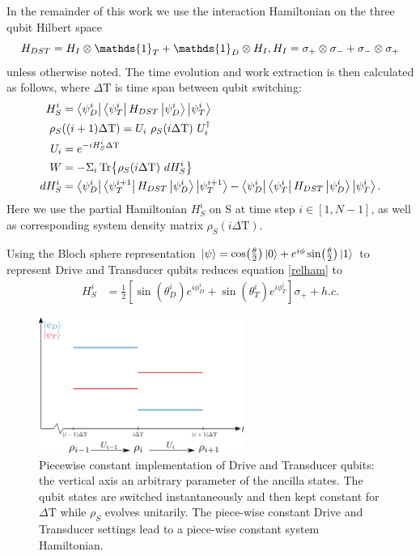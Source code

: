 In the remainder of this work we use the interaction Hamiltonian on the three qubit Hilbert space
\begin{equation*}
H_{DST} = H_{I} \otimes \mathds{1}_T + \mathds{1}_D \otimes H_{I}, \\
H_{I} = \sigma_{+} \otimes \sigma_{-} + \sigma_{-} \otimes \sigma_{+}
\end{equation*}
unless otherwise noted.
The time evolution and work extraction is then calculated as follows, where $\Delta \mathrm{T}$ is time span between qubit switching:
\begin{align}
H_S^i &= \bra{\psi_D^i}\bra{\psi_T^i} H_{DST} \ket{\psi_D^i} \ket{\psi_T^i} \label{relham}\\
\rho_S &((i+1) \Delta \mathrm{T}) = U_i \ \rho_S(i \Delta \mathrm{T}) \ U^{\dagger}_i \\
U_i &= e^{-iH_S^i \Delta \mathrm{T}} \\
W &= - \Sigma_i \Tr{\rho_S(i \Delta \mathrm{T}) \ dH_S^i} \\
dH_S^i &= \bra{\psi_D^i}\bra{\psi_T^{i+1}} H_{DST} \ket{\psi_D^i} \ket{\psi_T^{i+1}} - \bra{\psi_D^i}\bra{\psi_T^i} H_{DST} \ket{\psi_D^i} \ket{\psi_T^i}.	
\end{align}
Here we use the partial Hamiltonian $H_S^i$ on S at time step $i \in [1, N - 1]$, as well as corresponding system density matrix $\rho_S(i \Delta \mathrm{T})$.

Using the Bloch sphere representation $\ket{\psi} = \cos(\frac{\theta}{2}) \ket{0} + e^{i \phi} \sin(\frac{\theta}{2})\ket{1}$ to represent Drive and Transducer qubits reduces equation \ref{relham} to
\begin{align}
	H_S^i &= \frac{1}{2} \left[\sin(\theta_D^i) e^{i\phi_D^i} + \sin(\theta_T^i) e^{i\phi_T^i}\right] \sigma_{+} + h.c.
\end{align}

\begin{figure}
	\centering
	\includegraphics[width=0.6\textwidth]{img/pwc}
	\caption{Piecewise constant implementation of Drive and Transducer qubits: the vertical axis an arbitrary parameter of the ancilla states. The qubit states are switched instantaneously and then kept constant for $\Delta \mathrm{T}$ while $\rho_S$ evolves unitarily. The piece-wise constant Drive and Transducer settings lead to a piece-wise constant system Hamiltonian.}
	\label{pwc}
\end{figure}

